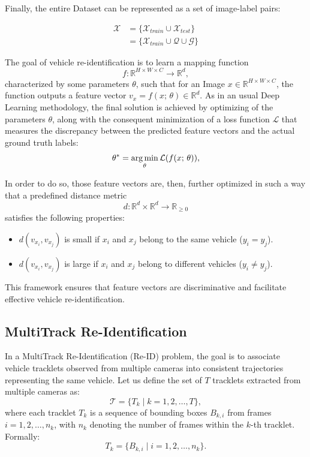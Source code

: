 Finally, the entire Dataset can be represented as a set of image-label pairs:

\begin{equation}
    \begin{aligned}
        \mathcal{X} & = \{\mathcal{X}_{train} \cup \mathcal{X}_{test}\}\\
                    & = \{\mathcal{X}_{train} \cup \mathcal{Q} \cup \mathcal{G}\}
    \end{aligned}
  \end{equation}

The goal of vehicle re-identification is to learn a mapping function 
\[
    f : \mathbb{R}^{H \times W \times C} \to \mathbb{R}^d,
\] 
characterized by some parameters \(\theta\), such that for an Image \(x \in \mathbb{R}^{H \times W \times C}\), the function outputs a feature vector \(v_{x} = f(x; \,\theta) \in \mathbb{R}^d\). As in an usual Deep Learning methodology, the final solution is achieved by optimizing of the parameters \(\theta\), along with the consequent minimization of a loss function \(\mathcal{L}\) that measures the discrepancy between the predicted feature vectors and the actual ground truth labels:
\[
    \theta^{*} = \operatorname*{arg\,min}_{\theta} \mathcal{L}(f(x; \,\theta)),
\]

In order to do so, those feature vectors are, then, further optimized in such a way that a predefined distance metric 
\[
    d: \mathbb{R}^d \times \mathbb{R}^d \to \mathbb{R}_{\geq 0}
\]
satisfies the following properties:
\begin{itemize}
    \item \(d(v_{x_i}, v_{x_j})\) is small if \(x_i\) and \(x_j\) belong to the same vehicle (\(y_i = y_j\)).
    \item \(d(v_{x_i}, v_{x_j})\) is large if \(x_i\) and \(x_j\) belong to different vehicles (\(y_i \neq y_j\)).
\end{itemize}

This framework ensures that feature vectors are discriminative and facilitate effective vehicle re-identification.

\subsection{MultiTrack Re-Identification}
In a MultiTrack Re-Identification (Re-ID) problem, the goal is to associate vehicle tracklets observed from multiple cameras into consistent trajectories representing the same vehicle. Let us define the set of $T$ tracklets extracted from multiple cameras as:
\[
    \mathcal{T} = \{T_k \mid k = 1, 2, \ldots, T\},
\]
where each tracklet $T_k$ is a sequence of bounding boxes $B_{k, i}$ from frames $i = 1, 2, \ldots, n_k$, with $n_k$ denoting the number of frames within the $k$-th tracklet. Formally:
\[
    T_k = \{B_{k, i} \mid i = 1, 2, \ldots, n_k\}.
\]

